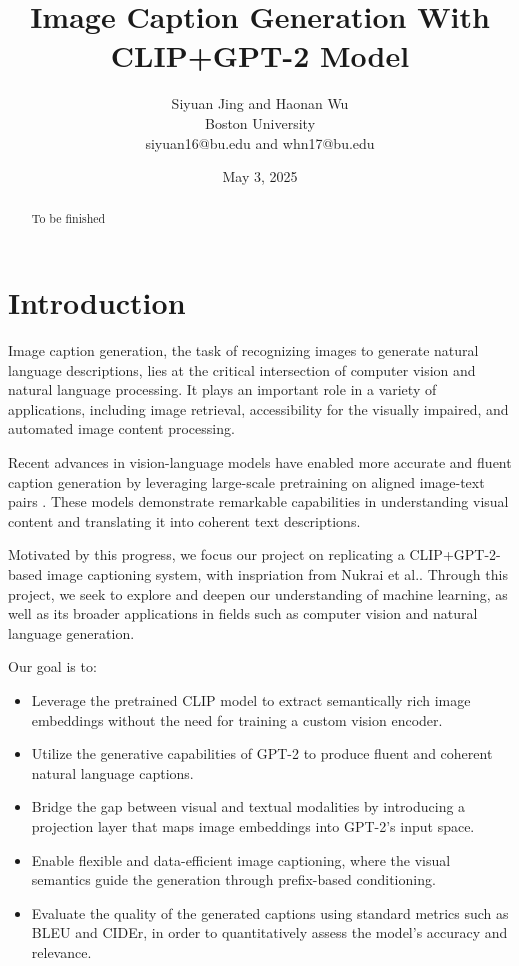 \documentclass[11pt]{article}
\begin{document}
\title{Image Caption Generation With CLIP+GPT-2 Model}
\author{Siyuan Jing and Haonan Wu\\ Boston University \\ siyuan16@bu.edu and whn17@bu.edu}
\date{May 3, 2025}
\maketitle

\begin{abstract}
To be finished
\end{abstract}

\section{Introduction}
Image caption generation, the task of recognizing images to generate natural language descriptions, lies at the critical intersection of 
computer vision and natural language processing. 
It plays an important role in a variety of applications, including image retrieval, accessibility for the visually impaired, and automated image content processing.

Recent advances in vision-language models have enabled more accurate and 
fluent caption generation by leveraging large-scale pretraining on aligned image-text pairs 
. These models demonstrate remarkable capabilities in understanding visual content and 
translating it into coherent text descriptions.

Motivated by this progress, we focus our project on replicating a CLIP+GPT-2-based image captioning system, with inspriation from Nukrai et al.\cite{Nukrai2022}. Through this project, we seek to explore and deepen our understanding of 
machine learning, as well as its broader applications in fields such as computer vision and natural language generation.

Our goal is to:
\begin{itemize}
    \item Leverage the pretrained CLIP model to extract semantically rich image embeddings without the need for training a custom vision encoder.
    \item Utilize the generative capabilities of GPT-2 to produce fluent and coherent natural language captions.
    \item Bridge the gap between visual and textual modalities by introducing a projection layer that maps image embeddings into GPT-2's input space.
    \item Enable flexible and data-efficient image captioning, where the visual semantics guide the generation through prefix-based conditioning.
    \item Evaluate the quality of the generated captions using standard metrics such as BLEU and CIDEr, in order to quantitatively assess the model's accuracy and relevance.
\end{itemize}
\pagebreak
\end{document}
